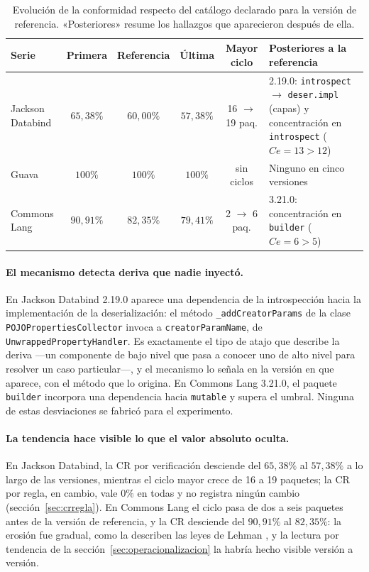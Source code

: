\begin{table}[H]
\centering
\caption{Evolución de la conformidad respecto del catálogo declarado para la versión de referencia. «Posteriores» resume los hallazgos que aparecieron después de ella.}
\label{tab:evolucion}
\footnotesize
\begin{tabularx}{\textwidth}{lccccX}
\toprule
\textbf{Serie} & \textbf{Primera} & \textbf{Referencia} & \textbf{Última} & \textbf{Mayor ciclo} & \textbf{Posteriores a la referencia} \\
\midrule
Jackson Databind & $65{,}38\%$ & $60{,}00\%$ & $57{,}38\%$ & 16 $\rightarrow$ 19 paq. & 2.19.0: \texttt{introspect} $\rightarrow$ \texttt{deser.impl} (capas) y concentración en \texttt{introspect} ($Ce = 13 > 12$) \\
Guava & $100\%$ & $100\%$ & $100\%$ & sin ciclos & Ninguno en cinco versiones \\
Commons Lang & $90{,}91\%$ & $82{,}35\%$ & $79{,}41\%$ & 2 $\rightarrow$ 6 paq. & 3.21.0: concentración en \texttt{builder} ($Ce = 6 > 5$) \\
\bottomrule
\end{tabularx}
\end{table}

\paragraph{El mecanismo detecta deriva que nadie inyectó.} En Jackson Databind 2.19.0 aparece una dependencia de la introspección hacia la implementación de la deserialización: el método \texttt{\_addCreatorParams} de la clase \texttt{POJOPropertiesCollector} invoca a \texttt{creatorParamName}, de \texttt{UnwrappedPropertyHandler}. Es exactamente el tipo de atajo que describe la deriva ---un componente de bajo nivel que pasa a conocer uno de alto nivel para resolver un caso particular---, y el mecanismo lo señala en la versión en que aparece, con el método que lo origina. En Commons Lang 3.21.0, el paquete \texttt{builder} incorpora una dependencia hacia \texttt{mutable} y supera el umbral. Ninguna de estas desviaciones se fabricó para el experimento.

\paragraph{La tendencia hace visible lo que el valor absoluto oculta.} En Jackson Databind, la CR por verificación desciende del $65{,}38\%$ al $57{,}38\%$ a lo largo de las versiones, mientras el ciclo mayor crece de 16 a 19 paquetes; la CR por regla, en cambio, vale $0\%$ en todas y no registra ningún cambio (sección~\ref{sec:crregla}). En Commons Lang el ciclo pasa de dos a seis paquetes antes de la versión de referencia, y la CR desciende del $90{,}91\%$ al $82{,}35\%$: la erosión fue gradual, como la describen las leyes de Lehman \citep{Lehman1980}, y la lectura por tendencia de la sección~\ref{sec:operacionalizacion} la habría hecho visible versión a versión.

